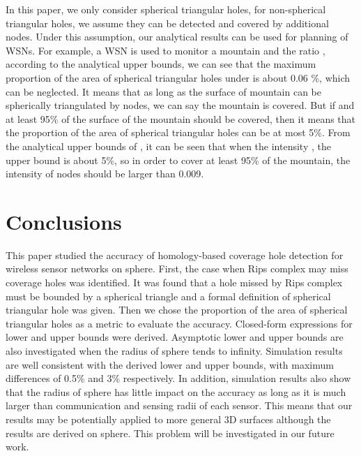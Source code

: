 \documentclass[journal, twoside]{IEEEtran}
\begin{document}
In this paper, we only consider spherical
triangular holes, for non-spherical triangular holes, we assume
they can be detected and covered by additional nodes. Under this
assumption, our analytical results can be used for planning 
of WSNs. For example, a WSN is used to monitor a mountain and 
the ratio , according to the analytical upper bounds, 
we can see that the maximum proportion of the area of spherical triangular
holes under  is about 0.06 \%, which can be neglected.
It means that as long as the surface of mountain can be 
spherically triangulated by nodes, we can say the mountain
is covered. But if  and at least 95\% of the surface of 
the mountain should be covered, then it means that the proportion
of the area of spherical triangular holes can be at most 5\%.
From the analytical upper bounds of , it can be 
seen that when the intensity , the upper bound
is about 5\%, so in order to cover at least 95\% of the mountain,
the intensity of nodes should be larger than 0.009.


















\section{Conclusions}

This paper studied the accuracy of homology-based coverage hole detection for wireless
sensor networks on sphere. First, the case when Rips complex may miss coverage
holes was identified. It was found that a hole missed by Rips complex must be 
bounded by a spherical triangle and a formal definition of spherical triangular
hole was given. Then we chose the proportion of the area of spherical triangular
holes as a metric to evaluate the accuracy. Closed-form expressions for
lower and upper bounds were derived. Asymptotic lower and upper bounds
are also investigated when the radius of sphere tends to infinity. 
Simulation results are well consistent with
the derived lower and upper bounds, with maximum differences of 0.5\% and 3\% respectively.
In addition, simulation results also show that the radius of sphere has little 
impact on the accuracy as long as it is much larger than communication and sensing 
radii of each sensor. This means that our results may be potentially applied to more general 3D surfaces
although the results are derived on sphere. This problem will be investigated in our future work.
\end{document}
